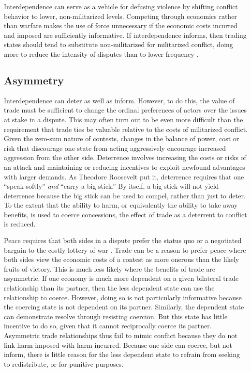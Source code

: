 \documentclass[12pt]{article}
\theoremstyle{hypothesis}
\begin{document}

Interdependence can serve as a vehicle for defusing violence by shifting conflict behavior to lower, non-militarized levels.  Competing through economics rather than warfare makes the use of force unnecessary if the economic costs incurred and imposed are sufficiently informative. If interdependence informs, then trading states should tend to substitute non-militarized for militarized conflict, doing more to reduce the intensity of disputes than to lower frequency \citep{Gartzke:2003}.

\subsection*{Asymmetry}

Interdependence can deter as well as inform.  However, to do this, the value of trade must be sufficient to change the ordinal preferences of actors over the issues at stake in a dispute.  This may often turn out to be even more difficult than the requirement that trade ties be valuable relative to the costs of militarized conflict.  Given the zero-sum nature of contests, changes in the balance of power, cost or risk that discourage one state from acting aggressively encourage increased aggression from the other side.  Deterrence involves increasing the costs or risks of an attack and maintaining or reducing incentives to exploit newfound advantages with larger demands.  As Theodore Roosevelt put it, deterrence requires that one ``speak softly'' {\it and} ``carry a big stick.''  By itself, a big stick will not yield deterrence because the big stick can be used to compel, rather than just to deter.  To the extent that the ability to harm, or equivalently the ability to take away benefits, is used to coerce concessions, the effect of trade as a deterrent to conflict is reduced.

Peace requires that both sides in a dispute prefer the status quo or a negotiated bargain to the costly lottery of war \citep{fearon:1995}.  Trade can be a reason to prefer peace where both sides view the economic costs of a contest as more onerous than the likely fruits of victory.  This is much less likely where the benefits of trade are asymmetric. If one economy is much more dependent on a given bilateral trade relationship than its partner, then the less dependent state can use the relationship to coerce. However, doing so is not particularly informative because the coercing state is not dependent on its partner.  Similarly, the dependent state can demonstrate resolve through resisting coercion.  But this state has little incentive to do so, given that it cannot reciprocally coerce its partner.  Asymmetric trade relationships thus fail to mimic conflict because they do not link harm imposed with harm incurred. Because one side can coerce, but not inform, there is little reason for the less dependent state to refrain from seeking to redistribute, or for punitive purposes.
\end{document}
